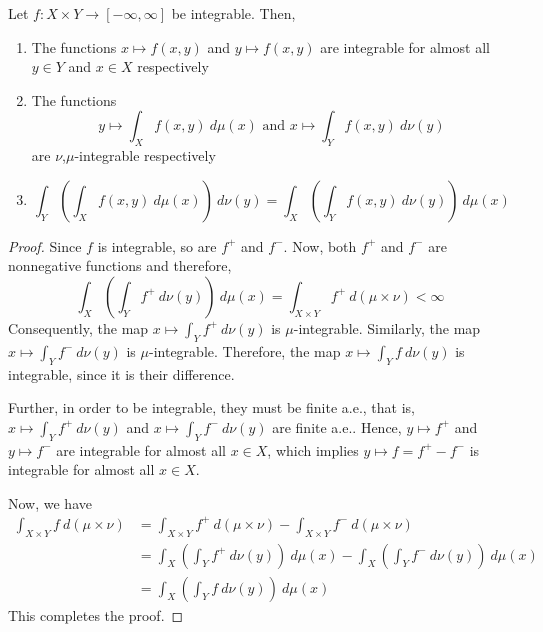 \begin{theorem}
    Let $f: X\times Y\to[-\infty,\infty]$ be integrable. Then, 
    \begin{enumerate}[label=(\alph*)]
    \item The functions $x\mapsto f(x,y)$ and $y\mapsto f(x,y)$ are integrable for almost all $y\in Y$ and $x\in X$ respectively
    \item The functions 
    \begin{equation*}
        y\mapsto\int_X f(x,y)~d\mu(x)\text{ and } x\mapsto\int_Y f(x,y)~d\nu(y)
    \end{equation*}
    are $\nu$,$\mu$-integrable respectively
    \item 
    \begin{equation*}
        \int_Y\left(\int_X f(x,y)~d\mu(x)\right)~d\nu(y) = \int_X\left(\int_Y f(x,y)~d\nu(y)\right)~d\mu(x)
    \end{equation*}
    \end{enumerate}
\end{theorem}
\begin{proof}
    Since $f$ is integrable, so are $f^+$ and $f^-$. Now, both $f^+$ and $f^-$ are nonnegative functions and therefore, 
    \begin{equation*}
        \int_X\left(\int_Y f^+~d\nu(y)\right)~d\mu(x) = \int_{X\times Y} f^+~d(\mu\times\nu) < \infty
    \end{equation*}
    Consequently, the map $x\mapsto\int_Y f^+~d\nu(y)$ is $\mu$-integrable. Similarly, the map $x\mapsto\int_Y f^-~d\nu(y)$ is $\mu$-integrable. Therefore, the map $x\mapsto\int_Y f~d\nu(y)$ is integrable, since it is their difference.

    Further, in order to be integrable, they must be finite a.e., that is, $x\mapsto\int_Yf^+~d\nu(y)$ and $x\mapsto\int_Y f^-~d\nu(y)$ are finite a.e.. Hence, $y\mapsto f^+$ and $y\mapsto f^-$ are integrable for almost all $x\in X$, which implies $y\mapsto f = f^+ - f^-$ is integrable for almost all $x\in X$.

    Now, we have 
    \begin{align*}
        \int_{X\times Y}f~d(\mu\times\nu) &= \int_{X\times Y}f^+~d(\mu\times\nu) - \int_{X\times Y} f^-~d(\mu\times\nu)\\
        &= \int_X\left(\int_Yf^+~d\nu(y)\right)~d\mu(x) - \int_X\left(\int_Y f^-~d\nu(y)\right)~d\mu(x)\\
        &= \int_X\left(\int_Y f~d\nu(y)\right)~d\mu(x)
    \end{align*}
    This completes the proof.
\end{proof}

